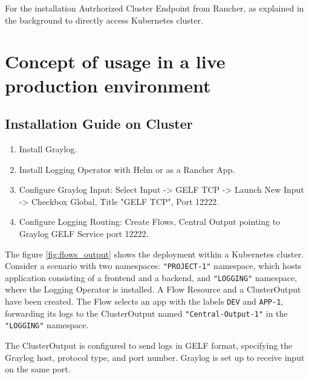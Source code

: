\documentclass[../main.tex]{subfiles}
\begin{document}
For the installation Autrhorized Cluster Endpoint from Rancher, as explained in the background to directly access Kubernetes cluster.

\clearpage
\section{Concept of usage in a live production environment}

\subsection{Installation Guide on Cluster}

\begin{enumerate}
    \item Install Graylog.
    \item Install Logging Operator with Helm or as a Rancher App.
    \item Configure Graylog Input: 
    Select Input -> GELF TCP -> Launch New Input -> Checkbox Global, Title "GELF TCP", Port 12222.
    \item Configure Logging Routing: Create Flows, Central Output pointing to Graylog GELF Service port 12222.
\end{enumerate}

The figure \ref{fig:flows_output} shows the deployment within a Kubernetes cluster. Consider a scenario with two namespaces: \texttt{"PROJECT-1"} namespace, which hosts application consisting of a frontend and a backend, and \texttt{"LOGGING"} namespace, where the Logging Operator is installed. A Flow Resource and a ClusterOutput have been created. The Flow selects an app with the labels \texttt{DEV} and \texttt{APP-1}, forwarding its logs to the ClusterOutput named \texttt{"Central-Output-1"} in the \texttt{"LOGGING"} namespace.  

The ClusterOutput is configured to send logs in GELF format, specifying the Graylog host, protocol type, and port number. Graylog is set up to receive input on the same port.
\end{document}
